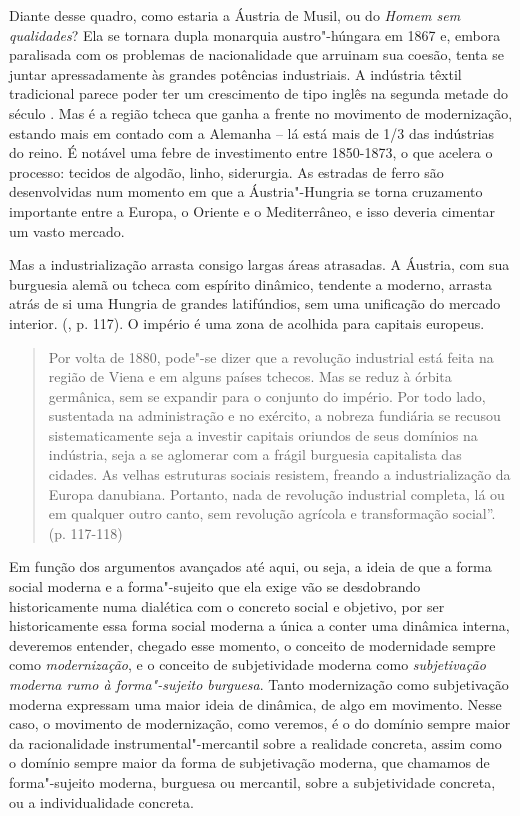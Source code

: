 Diante desse quadro, como estaria a Áustria de Musil, ou do \emph{Homem
sem qualidades}? Ela se tornara dupla monarquia austro"-húngara em 1867
e, embora paralisada com os problemas de nacionalidade que arruinam sua
coesão, tenta se juntar apressadamente às grandes potências industriais.
A indústria têxtil tradicional parece poder ter um crescimento de tipo
inglês na segunda metade do século . Mas é a região tcheca que ganha
a frente no movimento de modernização, estando mais em contado com a
Alemanha -- lá está mais de 1/3 das indústrias do reino. É notável uma
febre de investimento entre 1850-1873, o que acelera o processo: tecidos
de algodão, linho, siderurgia. As estradas de ferro são desenvolvidas
num momento em que a Áustria"-Hungria se torna cruzamento importante
entre a Europa, o Oriente e o Mediterrâneo, e isso deveria cimentar um
vasto mercado.

Mas a industrialização arrasta consigo largas áreas atrasadas. A
Áustria, com sua burguesia alemã ou tcheca com espírito dinâmico,
tendente a moderno, arrasta atrás de si uma Hungria de grandes
latifúndios, sem uma unificação do mercado interior. (, p. 117). O
império é uma zona de acolhida para capitais europeus.

\begin{quote}
Por volta de 1880, pode"-se dizer que a revolução industrial está feita
na região de Viena e em alguns países tchecos. Mas se reduz à órbita
germânica, sem se expandir para o conjunto do império. Por todo lado,
sustentada na administração e no exército, a nobreza fundiária se
recusou sistematicamente seja a investir capitais oriundos de seus
domínios na indústria, seja a se aglomerar com a frágil burguesia
capitalista das cidades. As velhas estruturas sociais resistem, freando
a industrialização da Europa danubiana. Portanto, nada de revolução
industrial completa, lá ou em qualquer outro canto, sem revolução
agrícola e transformação social''. (p. 117-118)
\end{quote}

Em função dos argumentos avançados até aqui, ou seja, a
ideia de que a forma social moderna e a forma"-sujeito que ela exige vão
se desdobrando historicamente numa dialética com o concreto social e
objetivo, por ser historicamente essa forma social moderna a única a
conter uma dinâmica interna, deveremos entender, chegado esse momento,
o conceito de modernidade sempre como \emph{modernização},
e o conceito de subjetividade moderna como \emph{subjetivação moderna
rumo à forma"-sujeito burguesa}. Tanto modernização como subjetivação
moderna expressam uma maior ideia de dinâmica, de algo em movimento.
Nesse caso, o movimento de modernização, como veremos, é o do domínio
sempre maior da racionalidade instrumental"-mercantil sobre a realidade
concreta, assim como o domínio sempre maior da forma de subjetivação
moderna, que chamamos de forma"-sujeito moderna, burguesa ou mercantil,
sobre a subjetividade concreta, ou a individualidade concreta.

